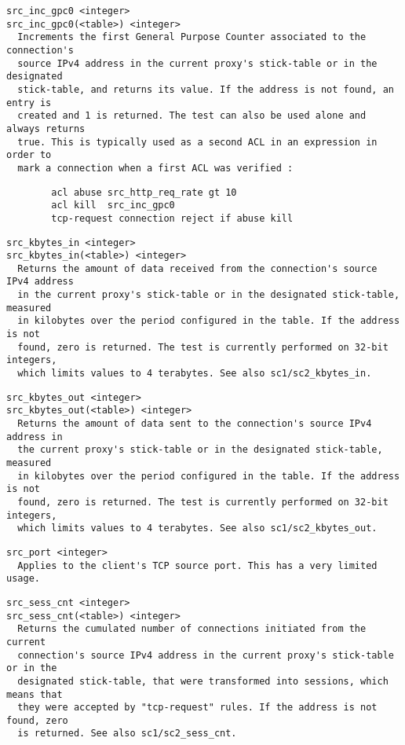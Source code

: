 \begin{verbatim}
src_inc_gpc0 <integer>
src_inc_gpc0(<table>) <integer>
  Increments the first General Purpose Counter associated to the connection's
  source IPv4 address in the current proxy's stick-table or in the designated
  stick-table, and returns its value. If the address is not found, an entry is
  created and 1 is returned. The test can also be used alone and always returns
  true. This is typically used as a second ACL in an expression in order to
  mark a connection when a first ACL was verified :
\end{verbatim}

\begin{verbatim}
        acl abuse src_http_req_rate gt 10
        acl kill  src_inc_gpc0
        tcp-request connection reject if abuse kill
\end{verbatim}

\begin{verbatim}
src_kbytes_in <integer>
src_kbytes_in(<table>) <integer>
  Returns the amount of data received from the connection's source IPv4 address
  in the current proxy's stick-table or in the designated stick-table, measured
  in kilobytes over the period configured in the table. If the address is not
  found, zero is returned. The test is currently performed on 32-bit integers,
  which limits values to 4 terabytes. See also sc1/sc2_kbytes_in.
\end{verbatim}

\begin{verbatim}
src_kbytes_out <integer>
src_kbytes_out(<table>) <integer>
  Returns the amount of data sent to the connection's source IPv4 address in
  the current proxy's stick-table or in the designated stick-table, measured
  in kilobytes over the period configured in the table. If the address is not
  found, zero is returned. The test is currently performed on 32-bit integers,
  which limits values to 4 terabytes. See also sc1/sc2_kbytes_out.
\end{verbatim}

\begin{verbatim}
src_port <integer>
  Applies to the client's TCP source port. This has a very limited usage.
\end{verbatim}

\begin{verbatim}
src_sess_cnt <integer>
src_sess_cnt(<table>) <integer>
  Returns the cumulated number of connections initiated from the current
  connection's source IPv4 address in the current proxy's stick-table or in the
  designated stick-table, that were transformed into sessions, which means that
  they were accepted by "tcp-request" rules. If the address is not found, zero
  is returned. See also sc1/sc2_sess_cnt.
\end{verbatim}

